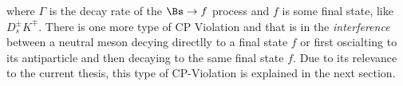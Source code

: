 \noindent where $\Gamma$ is the decay rate of the $\Bs \rightarrow f$ process and $f$ is some final state,
like $D_s^{\pm}K^{\mp}$. There is one more type of CP Violation and that is in the {\it interference} between
a neutral meson decying directlly to a final state $f$ or first oscialting to its antiparticle and then decaying
to the same final state $f$. Due to its relevance to the current thesis, this type of CP-Violation is explained
in the next section.
